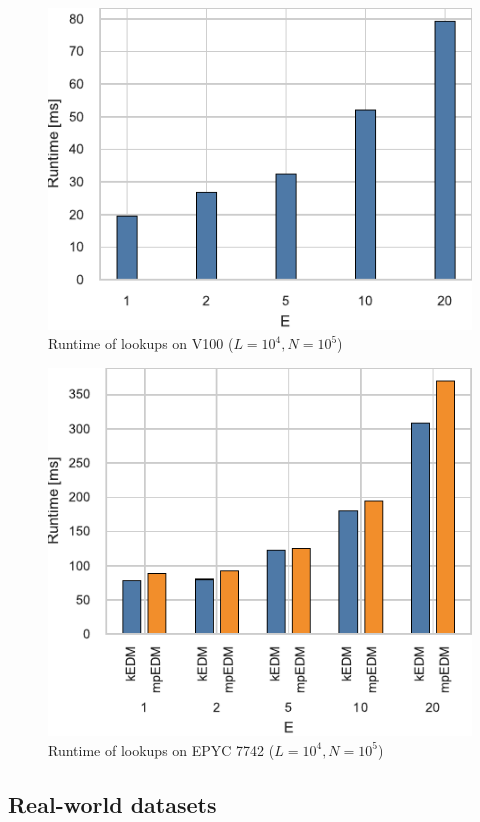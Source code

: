 \documentclass[sigconf]{acmart}
\begin{document}
\begin{figure}
    \centering
    \includegraphics{figs/runtime_lookup_v100}
    \caption{Runtime of lookups on V100 ($L=10^4, N=10^5$)}%
    \label{fig:breakdown-lookup-v100}
\end{figure}

\begin{figure}
    \centering
    \includegraphics{figs/runtime_lookup_epyc}
    \caption{Runtime of lookups on EPYC 7742 ($L=10^4, N=10^5$)}%
    \label{fig:breakdown-lookup-epyc}
\end{figure}

\subsection{Real-world datasets}
\end{document}
